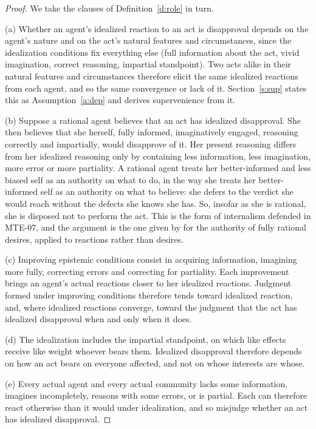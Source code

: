 \documentclass{situationist-preprint}
\begin{document}
\begin{proof}
We take the clauses of Definition~\ref{d:role} in turn.

(a) Whether an agent's idealized reaction to an act is disapproval depends on the agent's nature and on the act's natural features and circumstances, since the idealization conditions fix everything else (full information about the act, vivid imagination, correct reasoning, impartial standpoint). Two acts alike in their natural features and circumstances therefore elicit the same idealized reactions from each agent, and so the same convergence or lack of it. Section~\ref{s:sup} states this as Assumption~\ref{a:dep} and derives supervenience from it.

(b) Suppose a rational agent believes that an act has idealized disapproval. She then believes that she herself, fully informed, imaginatively engaged, reasoning correctly and impartially, would disapprove of it. Her present reasoning differs from her idealized reasoning only by containing less information, less imagination, more error or more partiality. A rational agent treats her better-informed and less biased self as an authority on what to do, in the way she treats her better-informed self as an authority on what to believe: she defers to the verdict she would reach without the defects she knows she has. So, insofar as she is rational, she is disposed not to perform the act. This is the form of internalism defended in MTE-07, and the argument is the one given by \citet{Smith1994} for the authority of fully rational desires, applied to reactions rather than desires.

(c) Improving epistemic conditions consist in acquiring information, imagining more fully, correcting errors and correcting for partiality. Each improvement brings an agent's actual reactions closer to her idealized reactions. Judgment formed under improving conditions therefore tends toward idealized reaction, and, where idealized reactions converge, toward the judgment that the act has idealized disapproval when and only when it does.

(d) The idealization includes the impartial standpoint, on which like effects receive like weight whoever bears them. Idealized disapproval therefore depends on how an act bears on everyone affected, and not on whose interests are whose.

(e) Every actual agent and every actual community lacks some information, imagines incompletely, reasons with some errors, or is partial. Each can therefore react otherwise than it would under idealization, and so misjudge whether an act has idealized disapproval.
\end{proof}
\end{document}
